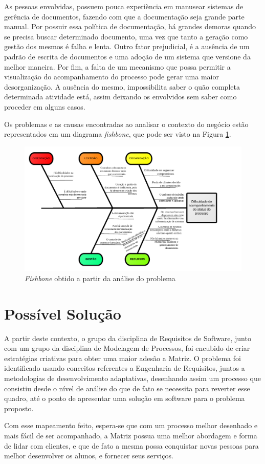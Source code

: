 As pessoas envolvidas, possuem pouca experiència em manusear 
sistemas de gerência de documentos, fazendo com que a documentação seja grande parte manual. Por 
possuir essa política de documentação, há grandes demoras quando se precisa buscar determinado 
documento, uma vez que tanto a geração como gestão dos mesmos é falha e lenta. Outro fator prejudicial, 
é a ausência de um padrão de escrita de documentos e uma adoção de um sistema que versione da melhor 
maneira. Por fim, a falta de um mecanismo que possa permitir a visualização do acompanhamento do processo
pode gerar uma maior desorganização. A ausência do mesmo, impossibilita saber o quão completa 
determinada atividade está, assim deixando os envolvidos sem saber como proceder
em alguns casos.

Os problemas e as causas encontradas ao analisar o contexto do negócio estão representados em 
um diagrama \textit{fishbone}, que pode ser visto na Figura \ref{fishbone}.
\begin{figure}[!htb]
\centering
\includegraphics[scale=0.6]{figuras/fish.png}
\caption{\textit{Fishbone} obtido a partir da análise do problema}
\label{fishbone}
\end{figure}
\section{Possível Solução}
A partir deste contexto, o grupo da disciplina de Requisitos de Software, junto com um 
grupo da disciplina de Modelagem de Processos, foi encubido de criar estratégias 
criativas para obter uma maior adesão a Matriz. O problema foi identificado
usando conceitos referentes a Engenharia de Requisitos, juntos a metodologias de 
desenvolvimento adaptativas, desenhando assim um processo que consistiu desde o nível 
de análise do que de fato se necessita para reverter esse quadro, até o ponto de 
apresentar uma solução em software para o problema proposto.

Com esse mapeamento feito, espera-se que com um processo melhor desenhado e mais fácil de ser
acompanhado, a Matriz possua uma melhor abordagem e forma de lidar com clientes, e que de fato
a mesma possa conquistar novas pessoas para melhor desenvolver os alunos, e fornecer seus serviços.
